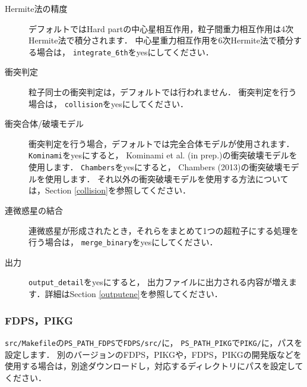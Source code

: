 \documentclass[12pt,a4paper,dvipdfmx]{jsarticle}
\begin{document}
\begin{description}
\item[Hermite法の精度]
デフォルトではHard partの中心星相互作用，粒子間重力相互作用は4次Hermite法で積分されます．
中心星重力相互作用を6次Hermite法で積分する場合は，%
\texttt{integrate\_6th}をyesにしてください．

\item[衝突判定]
粒子同士の衝突判定は，デフォルトでは行われません．
衝突判定を行う場合は，%
\texttt{collision}をyesにしてください．

\item[衝突合体/破壊モデル]
衝突判定を行う場合，デフォルトでは完全合体モデルが使用されます．
\texttt{Kominami}をyesにすると，
Kominami et al. (in prep.)の衝突破壊モデルを使用します．
\texttt{Chambers}をyesにすると，
Chambers (2013)の衝突破壊モデルを使用します．
それ以外の衝突破壊モデルを使用する方法については，Section \ref{collision}を参照してください．

\item[連微惑星の結合]
連微惑星が形成されたとき，それらをまとめて1つの超粒子にする処理を行う場合は，
\texttt{merge\_binary}をyesにしてください．


\item[出力]
\texttt{output\_detail}をyesにすると，
出力ファイルに出力される内容が増えます．詳細はSection \ref{outputene}を参照してください．



\end{description}

\subsubsection{FDPS，PIKG}
\texttt{src/Makefile}の\texttt{PS\_PATH\_FDPS}で\texttt{FDPS/src/}に，
\texttt{PS\_PATH\_PIKG}で\texttt{PIKG/}に，パスを設定します．
別のバージョンのFDPS，PIKGや，FDPS，PIKGの開発版などを使用する場合は，別途ダウンロードし，対応するディレクトリにパスを設定してください．
\end{document}
